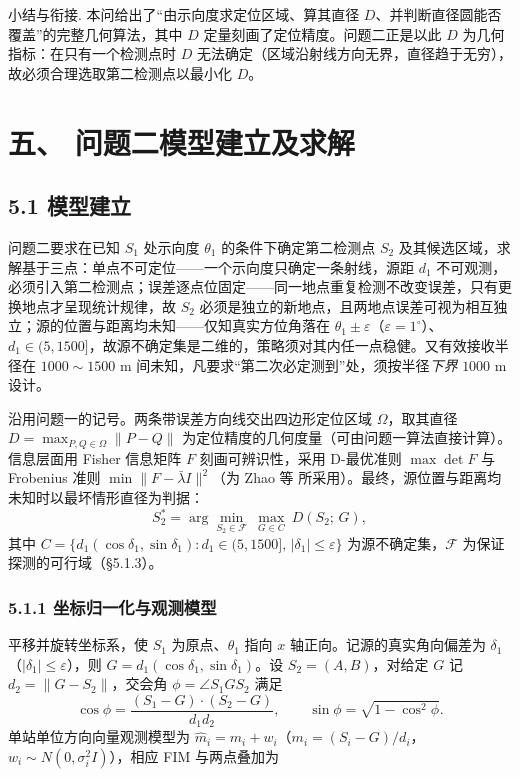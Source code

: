 \documentclass[UTF8, zihao=5,AutoFakeBold=2]{ctexart}
\begin{document}
	\medskip
	\noindent 小结与衔接. 本问给出了“由示向度求定位区域、算其直径 \(D\)、并判断直径圆能否覆盖”的完整几何算法，其中 \(D\) 定量刻画了定位精度。问题二正是以此 \(D\) 为几何指标：在只有一个检测点时 \(D\) 无法确定（区域沿射线方向无界，直径趋于无穷），故必须合理选取第二检测点以最小化 \(D\)。



\section*{五、 问题二模型建立及求解}

	\subsection*{5.1 模型建立}
		问题二要求在已知 \(S_1\) 处示向度 \(\theta_1\) 的条件下确定第二检测点 \(S_2\) 及其候选区域，求解基于三点：单点不可定位——一个示向度只确定一条射线，源距 \(d_1\) 不可观测，必须引入第二检测点；误差逐点位固定——同一地点重复检测不改变误差，只有更换地点才呈现统计规律，故 \(S_2\) 必须是独立的新地点，且两地点误差可视为相互独立；源的位置与距离均未知——仅知真实方位角落在 \(\theta_1\pm\varepsilon\)（\(\varepsilon=1^\circ\)）、\(d_1\in(5,1500]\)，故源不确定集是二维的，策略须对其内任一点稳健。又有效接收半径在 \(1000\sim1500\) m 间未知，凡要求“第二次必定测到”处，须按半径\emph{下界} \(1000\) m 设计。

		沿用问题一的记号。两条带误差方向线交出四边形定位区域 \(\Omega\)，取其直径 \(D=\max_{P,Q\in\Omega}\lVert P-Q\rVert\) 为定位精度的几何度量（可由问题一算法直接计算）。信息层面用 Fisher 信息矩阵 \(F\) 刻画可辨识性，采用 D-最优准则 \(\max\det F\) 与 Frobenius 准则 \(\min\lVert F-\bar\lambda I\rVert^2\)（为 Zhao 等\cite{zhao2012} 所采用）。最终，源位置与距离均未知时以最坏情形直径为判据：
		\begin{equation}
			S_2^\ast=\arg\min_{S_2\in\mathcal F}\ \max_{G\in C}\ D(S_2;\,G),
			\label{eq:minimax}
		\end{equation}
		其中 \(C=\{d_1(\cos\delta_1,\sin\delta_1):d_1\in(5,1500],\,|\delta_1|\le\varepsilon\}\) 为源不确定集，\(\mathcal F\) 为保证探测的可行域（\S5.1.3）。

		\subsubsection*{5.1.1 坐标归一化与观测模型}
		平移并旋转坐标系，使 \(S_1\) 为原点、\(\theta_1\) 指向 \(x\) 轴正向。记源的真实角向偏差为 \(\delta_1\)（\(|\delta_1|\le\varepsilon\)），则 \(G=d_1(\cos\delta_1,\sin\delta_1)\)。设 \(S_2=(A,B)\)，对给定 \(G\) 记 \(d_2=\lVert G-S_2\rVert\)，交会角 \(\phi=\angle S_1GS_2\) 满足
		\begin{equation}
			\cos\phi=\frac{(S_1-G)\cdot(S_2-G)}{d_1d_2},\qquad \sin\phi=\sqrt{1-\cos^2\phi}.
			\label{eq:phi}
		\end{equation}
		单站单位方向向量观测模型为 \(\hat m_i=m_i+w_i\)（\(m_i=(S_i-G)/d_i\)，\(w_i\sim N(0,\sigma_i^2I)\)），相应 FIM 与两点叠加为
		
\end{document}
